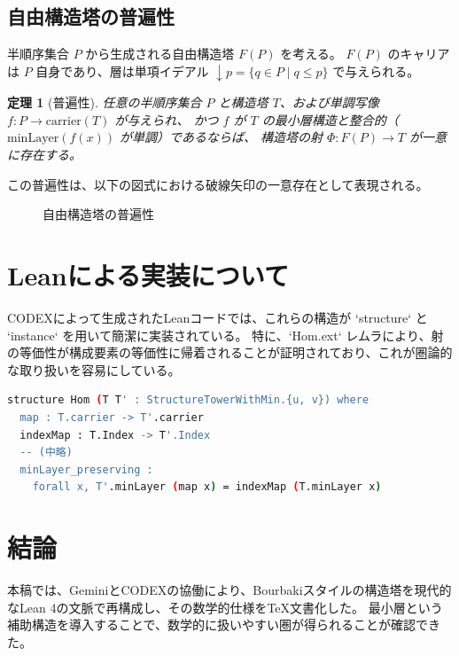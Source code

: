 \documentclass[a4paper,11pt]{article}
\theoremstyle{definition}
\theoremstyle{plain}
\newtheorem{theorem}[definition]{定理}
\begin{document}
\subsection{自由構造塔の普遍性}

半順序集合 $P$ から生成される自由構造塔 $F(P)$ を考える。
$F(P)$ のキャリアは $P$ 自身であり、層は単項イデアル $\downarrow p = \{q \in P \mid q \le p\}$ で与えられる。

\begin{theorem}[普遍性]
任意の半順序集合 $P$ と構造塔 $T$、および単調写像 $f: P \to \mathrm{carrier}(T)$ が与えられ、
かつ $f$ が $T$ の最小層構造と整合的（$\mathrm{minLayer}(f(x))$ が単調）であるならば、
構造塔の射 $\Phi: F(P) \to T$ が一意に存在する。
\end{theorem}

この普遍性は、以下の図式における破線矢印の一意存在として表現される。

\begin{figure}[htbp]
\centering
{}
\caption{自由構造塔の普遍性}
\end{figure}

\section{Leanによる実装について}

CODEXによって生成されたLeanコードでは、これらの構造が `structure` と `instance` を用いて簡潔に実装されている。
特に、`Hom.ext` レムラにより、射の等価性が構成要素の等価性に帰着されることが証明されており、これが圏論的な取り扱いを容易にしている。

\begin{lstlisting}[language=bash, basicstyle=\ttfamily\small, frame=single, caption=Leanコードの抜粋]
structure Hom (T T' : StructureTowerWithMin.{u, v}) where
  map : T.carrier -> T'.carrier
  indexMap : T.Index -> T'.Index
  -- (中略)
  minLayer_preserving : 
    forall x, T'.minLayer (map x) = indexMap (T.minLayer x)
\end{lstlisting}

\section{結論}
本稿では、GeminiとCODEXの協働により、Bourbakiスタイルの構造塔を現代的なLean 4の文脈で再構成し、その数学的仕様をTeX文書化した。
最小層という補助構造を導入することで、数学的に扱いやすい圏が得られることが確認できた。
\end{document}
